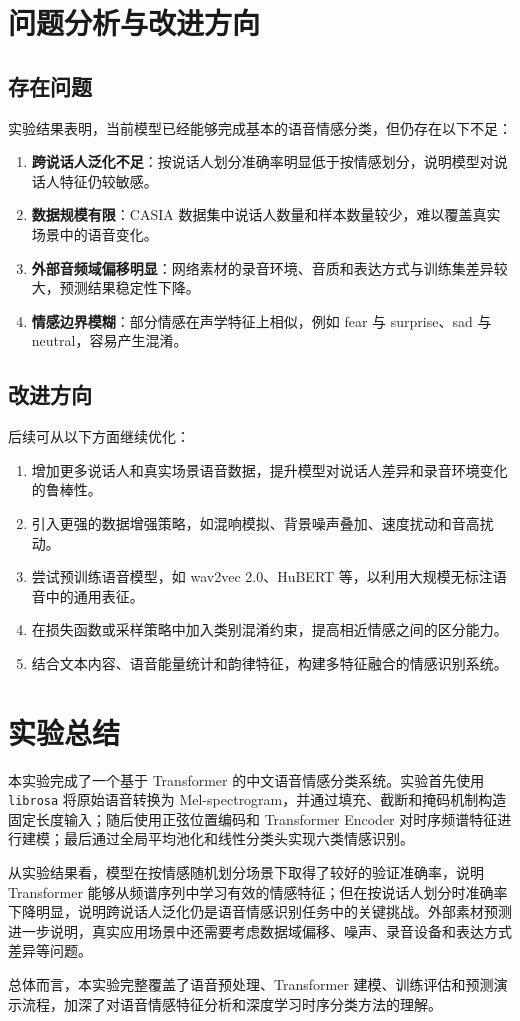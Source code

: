 \documentclass[UTF8,12pt,a4paper]{ctexart}
\begin{document}
\section{问题分析与改进方向}

\subsection{存在问题}
实验结果表明，当前模型已经能够完成基本的语音情感分类，但仍存在以下不足：
\begin{enumerate}
    \item \textbf{跨说话人泛化不足}：按说话人划分准确率明显低于按情感划分，说明模型对说话人特征仍较敏感。
    \item \textbf{数据规模有限}：CASIA 数据集中说话人数量和样本数量较少，难以覆盖真实场景中的语音变化。
    \item \textbf{外部音频域偏移明显}：网络素材的录音环境、音质和表达方式与训练集差异较大，预测结果稳定性下降。
    \item \textbf{情感边界模糊}：部分情感在声学特征上相似，例如 fear 与 surprise、sad 与 neutral，容易产生混淆。
\end{enumerate}

\subsection{改进方向}
后续可从以下方面继续优化：
\begin{enumerate}
    \item 增加更多说话人和真实场景语音数据，提升模型对说话人差异和录音环境变化的鲁棒性。
    \item 引入更强的数据增强策略，如混响模拟、背景噪声叠加、速度扰动和音高扰动。
    \item 尝试预训练语音模型，如 wav2vec 2.0、HuBERT 等，以利用大规模无标注语音中的通用表征。
    \item 在损失函数或采样策略中加入类别混淆约束，提高相近情感之间的区分能力。
    \item 结合文本内容、语音能量统计和韵律特征，构建多特征融合的情感识别系统。
\end{enumerate}

\section{实验总结}

本实验完成了一个基于 Transformer 的中文语音情感分类系统。实验首先使用 \texttt{librosa} 将原始语音转换为 Mel-spectrogram，并通过填充、截断和掩码机制构造固定长度输入；随后使用正弦位置编码和 Transformer Encoder 对时序频谱特征进行建模；最后通过全局平均池化和线性分类头实现六类情感识别。

从实验结果看，模型在按情感随机划分场景下取得了较好的验证准确率，说明 Transformer 能够从频谱序列中学习有效的情感特征；但在按说话人划分时准确率下降明显，说明跨说话人泛化仍是语音情感识别任务中的关键挑战。外部素材预测进一步说明，真实应用场景中还需要考虑数据域偏移、噪声、录音设备和表达方式差异等问题。

总体而言，本实验完整覆盖了语音预处理、Transformer 建模、训练评估和预测演示流程，加深了对语音情感特征分析和深度学习时序分类方法的理解。
\end{document}
